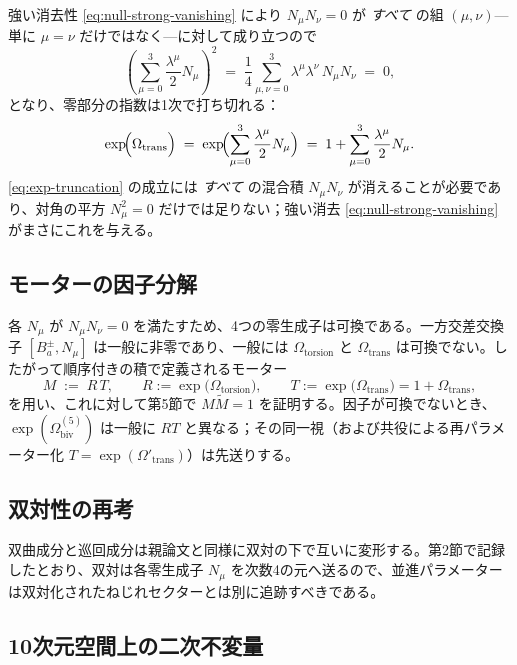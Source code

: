 \documentclass[dvipdfmx,11pt,a4paper]{article}
\theoremstyle{definition}
\theoremstyle{plain}
\theoremstyle{remark}
\begin{document}
強い消去性 \eqref{eq:null-strong-vanishing} により $N_{\mu}N_{\nu}=0$ が \emph{すべて} の組 $(\mu,\nu)$---単に $\mu=\nu$ だけではなく---に対して成り立つので
\begin{equation}
\left(\sum_{\mu=0}^{3}\frac{\lambda^{\mu}}{2}N_{\mu}\right)^{\!\!2}
\;=\;\frac{1}{4}\sum_{\mu,\nu=0}^{3}\lambda^{\mu}\lambda^{\nu}\,N_{\mu}N_{\nu}
\;=\;0,
\end{equation}
となり、零部分の指数は1次で打ち切れる：
\begin{equation}
\exp\!\Bigl( \Omega_{\text{trans}} \Bigr)
\;=\;\exp\!\Bigl(\sum_{\mu=0}^{3}\frac{\lambda^{\mu}}{2}N_{\mu}\Bigr)
\;=\;1+\sum_{\mu=0}^{3}\frac{\lambda^{\mu}}{2}N_{\mu}.
\label{eq:exp-truncation}
\end{equation}
\eqref{eq:exp-truncation} の成立には \emph{すべて} の混合積 $N_{\mu}N_{\nu}$ が消えることが必要であり、対角の平方 $N_{\mu}^{2}=0$ だけでは足りない；強い消去 \eqref{eq:null-strong-vanishing} がまさにこれを与える。

\subsection{モーターの因子分解}

各 $N_{\mu}$ が $N_{\mu}N_{\nu}=0$ を満たすため、4つの零生成子は可換である。一方交差交換子 $[B_{a}^{\pm},N_{\mu}]$ は一般に非零であり、一般には $\Omega_{\text{torsion}}$ と $\Omega_{\text{trans}}$ は可換でない。したがって順序付きの積で定義されるモーター
\begin{equation}
M \;:=\; R\,T,
\qquad
R := \exp\!\bigl(\Omega_{\text{torsion}}\bigr),\qquad
T := \exp\!\bigl(\Omega_{\text{trans}}\bigr)=1+\Omega_{\text{trans}},
\end{equation}
を用い、これに対して第5節で $M\widetilde{M}=1$ を証明する。因子が可換でないとき、$\exp(\Omega_{\text{biv}}^{(5)})$ は一般に $RT$ と異なる；その同一視（および共役による再パラメーター化 $T=\exp(\Omega'_{\text{trans}})$）は先送りする。

\subsection{双対性の再考}

双曲成分と巡回成分は親論文と同様に双対の下で互いに変形する。第2節で記録したとおり、双対は各零生成子 $N_{\mu}$ を次数4の元へ送るので、並進パラメーターは双対化されたねじれセクターとは別に追跡すべきである。

\subsection{10次元空間上の二次不変量}
\end{document}
